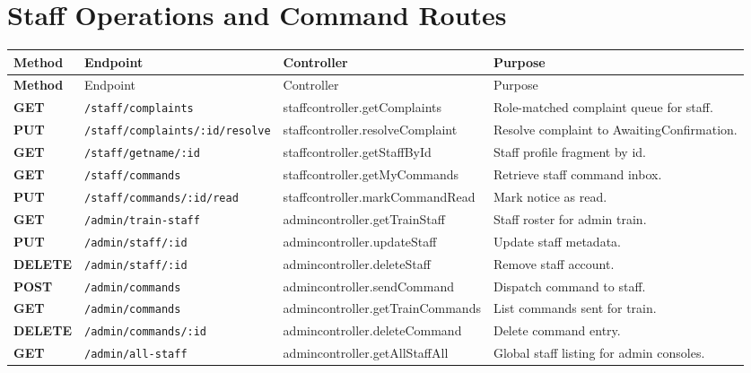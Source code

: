 \documentclass[12pt,a4paper]{report}
\renewcommand{\toprule}{\hline\hline}
\renewcommand{\midrule}{\hline}
\renewcommand{\bottomrule}{\hline\hline}
\begin{document}
\section{Staff Operations and Command Routes}
\begin{longtable}{>{\bfseries}p{} p{} p{} p{}}
\toprule
\rowcolor{TableHeader}
\textcolor{TableHeaderText}{Method} & \textcolor{TableHeaderText}{Endpoint} & \textcolor{TableHeaderText}{Controller} & \textcolor{TableHeaderText}{Purpose} \\
\midrule
\endfirsthead
\toprule
\rowcolor{TableHeader}
\textcolor{TableHeaderText}{Method} & \textcolor{TableHeaderText}{Endpoint} & \textcolor{TableHeaderText}{Controller} & \textcolor{TableHeaderText}{Purpose} \\
\midrule
\endhead
GET & \texttt{/staff/complaints} & staffcontroller.getComplaints & Role-matched complaint queue for staff. \\
PUT & \texttt{/staff/complaints/:id/resolve} & staffcontroller.resolveComplaint & Resolve complaint to AwaitingConfirmation. \\
GET & \texttt{/staff/getname/:id} & staffcontroller.getStaffById & Staff profile fragment by id. \\
GET & \texttt{/staff/commands} & staffcontroller.getMyCommands & Retrieve staff command inbox. \\
PUT & \texttt{/staff/commands/:id/read} & staffcontroller.markCommandRead & Mark notice as read. \\
GET & \texttt{/admin/train-staff} & admincontroller.getTrainStaff & Staff roster for admin train. \\
PUT & \texttt{/admin/staff/:id} & admincontroller.updateStaff & Update staff metadata. \\
DELETE & \texttt{/admin/staff/:id} & admincontroller.deleteStaff & Remove staff account. \\
POST & \texttt{/admin/commands} & admincontroller.sendCommand & Dispatch command to staff. \\
GET & \texttt{/admin/commands} & admincontroller.getTrainCommands & List commands sent for train. \\
DELETE & \texttt{/admin/commands/:id} & admincontroller.deleteCommand & Delete command entry. \\
GET & \texttt{/admin/all-staff} & admincontroller.getAllStaffAll & Global staff listing for admin consoles. \\
\bottomrule
\end{longtable}
\end{document}
